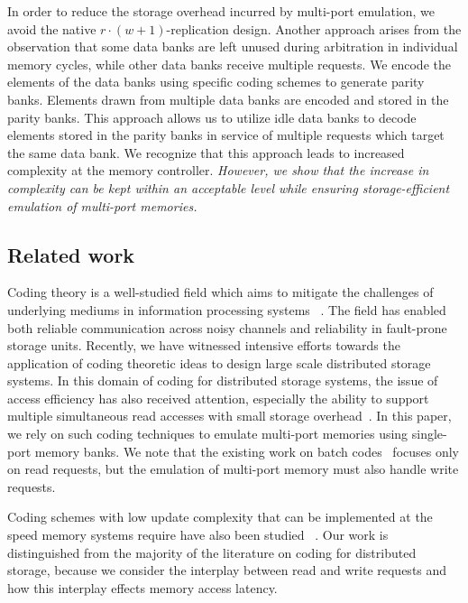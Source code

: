 In order to reduce the storage overhead incurred by multi-port emulation, we avoid the native $r\cdot(w + 1)$-replication design. Another approach arises from the observation that some data banks are left unused during arbitration in individual memory cycles, while other data banks receive multiple requests. We encode the elements of the data banks using specific coding schemes to generate parity banks. Elements drawn from multiple data banks are encoded and stored in the parity banks. This approach allows us to utilize idle data banks to decode elements stored in the parity banks in service of multiple requests which target the same data bank. We recognize that this approach leads to increased complexity at the memory controller. {\color{red} {\em However, we show that the increase in complexity can be kept within an acceptable level while ensuring storage-efficient emulation of multi-port memories.}}

\subsection{Related work}

Coding theory is a well-studied field which aims to mitigate the challenges of underlying mediums in information processing systems ~\cite{MacSlo, Cover}. The field has enabled both reliable communication across noisy channels and reliability in fault-prone storage units. Recently, we have witnessed intensive efforts towards the application of coding theoretic ideas to design large scale distributed storage systems\cite{Azure, SAPDVCB13, Rashmi14}. In this domain of coding for distributed storage systems, the issue of access efficiency has also received attention, especially the ability to support multiple simultaneous read accesses with small storage overhead~\cite{batchcodes, RPDV16, RSDG16, Wang2017}. In this paper, we rely on such coding techniques to emulate multi-port memories using single-port memory banks. We note that the existing work on batch codes~\cite{batchcodes} focuses only on read requests, but the emulation of multi-port memory must also handle write requests. 

Coding schemes with low update complexity that can be implemented at the speed memory systems require have also been studied ~\cite{ASV10, MCW14}. Our work is distinguished from the majority of the literature on coding for distributed storage, because we consider the interplay between read and write requests and how this interplay effects memory access latency.

